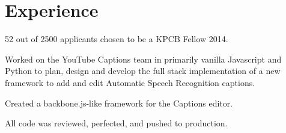 \documentclass[]{deedy-resume-openfont}
\begin{document}
\begin{minipage}[t]{0.66\textwidth} 


\section{ \textcolor{gray}{} Experience}

\vspace{\topsep} %
\begin{tightemize}\item 52 out of 2500 applicants chosen to be a KPCB Fellow 2014.
\end{tightemize}
\sectionsep

\begin{tightemize}
\item Worked on the YouTube Captions team in primarily vanilla Javascript and Python to plan, design and develop the full stack implementation of a new framework to add and edit Automatic Speech Recognition captions.\item Created a backbone.js-like framework for the Captions editor.\item All code was reviewed, perfected, and pushed to production.\end{tightemize}
\sectionsep

\end{minipage}
\end{document}
